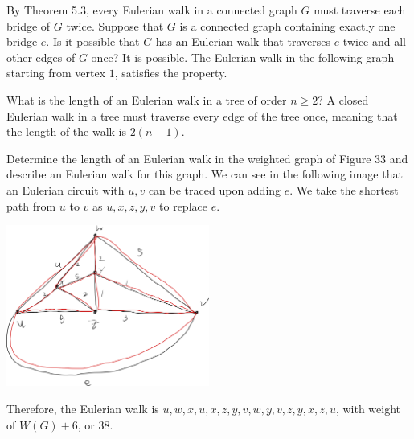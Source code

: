 \documentclass[10pt]{extarticle}
\title{}
\author{}
\date{}
\begin{document}
  \begin{problem}{13}
    By Theorem 5.3, every Eulerian walk in a connected graph $G$ must traverse each bridge of $G$ twice. Suppose that $G$ is a connected graph containing exactly one bridge $e$. Is it possible that $G$ has an Eulerian walk that traverses $e$ twice and all other edges of $G$ once?
    \tcblower
    It is possible. The Eulerian walk in the following graph starting from vertex $1$, satisfies the property.
    \begin{center}
    \end{center}
  \end{problem}
  \begin{problem}{14}
    What is the length of an Eulerian walk in a tree of order $n\geq 2$?
    \tcblower
    A closed Eulerian walk in a tree must traverse every edge of the tree once, meaning that the length of the walk is $2(n-1)$.
  \end{problem}
  \begin{problem}{15}
    Determine the length of an Eulerian walk in the weighted graph of Figure 33 and describe an Eulerian walk for this graph.
    \tcblower
    We can see in the following image that an Eulerian circuit with $u,v$ can be traced upon adding $e$. We take the shortest path from $u$ to $v$ as $u,x,z,y,v$ to replace $e$.
    \begin{center}
      \includegraphics[width=0.5\textwidth]{images/5_15_sol.png}
    \end{center}
    Therefore, the Eulerian walk is $u,w,x,u,x,z,y,v,w,y,v,z,y,x,z,u$, with weight of $W(G) + 6$, or $38$.
  \end{problem}
\end{document}
